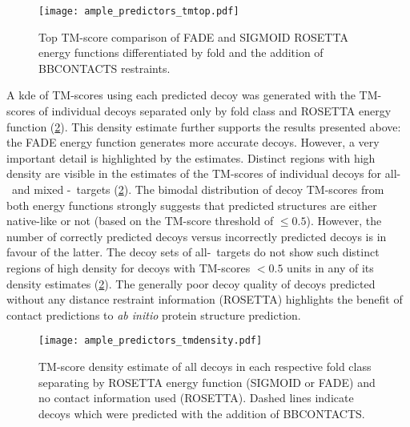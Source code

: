 \begin{figure}[H]
    \centering
    \texttt{[image: ample\_predictors\_tmtop.pdf]}
    \caption[Top TM-score comparison between ROSETTA energy functions]{Top TM-score comparison of FADE and SIGMOID ROSETTA energy functions differentiated by fold and the addition of BBCONTACTS restraints.}
    \label{fig:ample_predictor_tmtop}
\end{figure}

A \acrfull{kde} of TM-scores using each predicted decoy was generated with the TM-scores of individual decoys separated only by fold class and ROSETTA energy function (\cref{fig:ample_predictor_tmdensity}). This density estimate further supports the results presented above: the FADE energy function generates more accurate decoys. However, a very important detail is highlighted by the estimates. Distinct regions with high density are visible in the estimates of the TM-scores of individual decoys for all-\textalpha\ and mixed \textalpha-\textbeta\ targets (\cref{fig:ample_predictor_tmdensity}). The bimodal distribution of decoy TM-scores from both energy functions strongly suggests that predicted structures are either native-like or not (based on the TM-score threshold of $\leq0.5$). However, the number of correctly predicted decoys versus incorrectly predicted decoys is in favour of the latter. The decoy sets of all-\textbeta\ targets do not show such distinct regions of high density for decoys with TM-scores $<0.5$ units in any of its density estimates (\cref{fig:ample_predictor_tmdensity}). The generally poor decoy quality of decoys predicted without any distance restraint information (ROSETTA) highlights the benefit of contact predictions to \textit{ab initio} protein structure prediction.

\begin{figure}[H]
    \centering
    \texttt{[image: ample\_predictors\_tmdensity.pdf]}
    \caption[TM-score distribution by fold category and ROSETTA energy function]{TM-score density estimate of all decoys in each respective fold class separating by ROSETTA energy function (SIGMOID or FADE) and no contact information used (ROSETTA). Dashed lines indicate decoys which were predicted with the addition of BBCONTACTS.}
    \label{fig:ample_predictor_tmdensity}
\end{figure}

